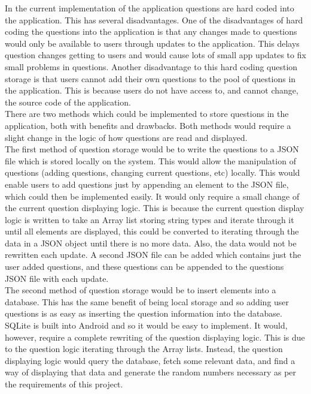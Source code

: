 \documentclass{article}
\begin{document}
In the current implementation of the application questions are hard coded into the application. This has several disadvantages. One of the disadvantages of hard coding the questions into the application is that any changes made to questions would only be available to users through updates to the application. This delays question changes getting to users and would cause lots of small app updates to fix small problems in questions. Another disadvantage to this hard coding question storage is that users cannot add their own questions to the pool of questions in the application. This is because users do not have access to, and cannot change, the source code of the application. \\

There are two methods which could be implemented to store questions in the application, both with benefits and drawbacks. Both methods would require a slight change in the logic of how questions are read and displayed. \\

The first method of question storage would be to write the questions to a JSON file which is stored locally on the system. This would allow the manipulation of questions (adding questions, changing current questions, etc) locally. This would enable users to add questions just by appending an element to the JSON file, which could then be implemented easily. It would only require a small change of the current question displaying logic. This is because the current question display logic is written to take an Array list storing string types and iterate through it until all elements are displayed, this could be converted to iterating through the data in a JSON object until there is no more data. Also, the data would not be rewritten each update. A second JSON file can be added which contains just the user added questions, and these questions can be appended to the questions JSON file with each update. \\

The second method of question storage would be to insert elements into a database. This has the same benefit of being local storage and so adding user questions is as easy as inserting the question information into the database. SQLite is built into Android and so it would be easy to implement. It would, however, require a complete rewriting of the question displaying logic. This is due to the question logic iterating through the Array lists. Instead, the question displaying logic would query the database, fetch some relevant data, and find a way of displaying that data and generate the random numbers necessary as per the requirements of this project. \\
\end{document}
